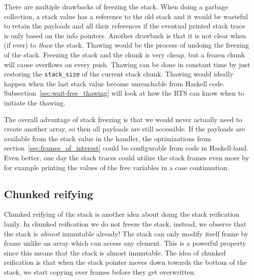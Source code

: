 There are multiple drawbacks of freezing the stack. When doing a garbage
collection, a stack value has a reference to the old stack and it would
be wasteful to retain the payloads and all their references if the
eventual printed stack trace is only based on the info pointers. Another
drawback is that it is not clear when (if ever) to \emph{thaw} the
stack. Thawing would be the process of undoing the freezing of the
stack. Freezing the stack and the chunk is very cheap, but a frozen chunk
will cause overflows on every push. Thawing can be done in
constant time by just restoring the \texttt{stack\_size} of the current
stack chunk. Thawing would ideally happen when the last stack value
become unreachable from Haskell code. Subsection~\ref{sec:wait-free_thawing}
will look at how the RTS can know when to initiate the thawing.

The overall advantage of stack freezing is that we would never actually
need to create another array, so then all payloads are still accessible.
If the payloads are available from the stack value in the handler,
the optimizations from section~\ref{sec:frames_of_interest} could be
configurable from code in Haskell-land. Even better, one day the stack
traces could utilize the stack frames even more by for example printing
the values of the free variables in a case continuation.

\subsection{Chunked reifying} \label{sec:chunked_reifying}

Chunked reifying of the stack is another idea about doing the stack
reification lazily. In chunked reification we do not freeze the stack, instead, we observe
that the stack is \emph{almost} immutable already! The stack can only
modify itself frame by frame unlike an array which can access any
element. This is a powerful property since this means that the stack is
almost immutable. The idea of chunked reification is that when the stack
pointer moves down towards the bottom of the stack, we start
copying over frames before they get overwritten.


